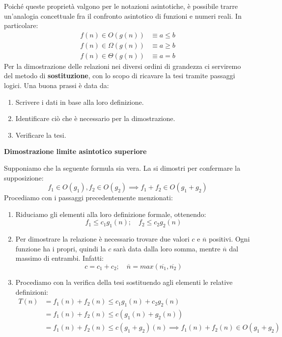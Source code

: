 \noindent Poiché queste proprietà valgono per le notazioni asintotiche, è possibile trarre un'analogia concettuale fra il confronto asintotico di funzioni e numeri reali. In particolare: \begin{equation}
	\begin{split}
		f(n)\in O(g(n)) &\equiv a \leq b\\
		f(n)\in \Omega(g(n)) &\equiv a \geq b\\
		f(n)\in \Theta(g(n)) &\equiv a = b
	\end{split}
\end{equation}
\noindent Per la dimostrazione delle relazioni nei diversi ordini di grandezza ci serviremo del metodo di \textbf{sostituzione}, con lo scopo di ricavare la tesi tramite passaggi logici. Una buona prassi è data da: \begin{enumerate}
	\item Scrivere i dati in base alla loro definizione.
	\item Identificare ciò che è necessario per la dimostrazione.
	\item Verificare la tesi.
\end{enumerate}
\begin{esempio}
	\textbf{Dimostrazione limite asintotico superiore}\par
	\noindent Supponiamo che la seguente formula sia vera. La si dimostri per confermare la supposizione: \[f_1 \in O(g_1), f_2 \in O(g_2) \implies f_1+f_2 \in O(g_1+g_2)\]
	\noindent Procediamo con i passaggi precedentemente menzionati: \begin{enumerate}
		\item Riduciamo gli elementi alla loro definizione formale, ottenendo: \[f_1 \leq c_1g_1(n);\quad f_2 \leq c_2g_2(n)\]
		\item Per dimostrare la relazione è necessario trovare due valori $c$ e $\overline{n}$ positivi. Ogni funzione ha i propri, quindi la $c$ sarà data dalla loro somma, mentre $\overline{n}$ dal massimo di entrambi. Infatti: \[c = c_1+c_2;\quad \overline{n} = max(\overline{n_1}, \overline{n_2})\]
		\item Procediamo con la verifica della tesi sostituendo agli elementi le relative definizioni: \begin{equation}
			\begin{split}
				T(n) &= f_1(n)+f_2(n) \leq c_1g_1(n) + c_2g_2(n)\\
				&= f_1(n)+f_2(n) \leq c(g_1(n) + g_2(n))\\
				&= f_1(n)+f_2(n) \leq c(g_1+g_2)(n) \implies f_1(n)+f_2(n) \in O(g_1+g_2)
			\end{split}
		\end{equation}
	\end{enumerate}
\end{esempio}
